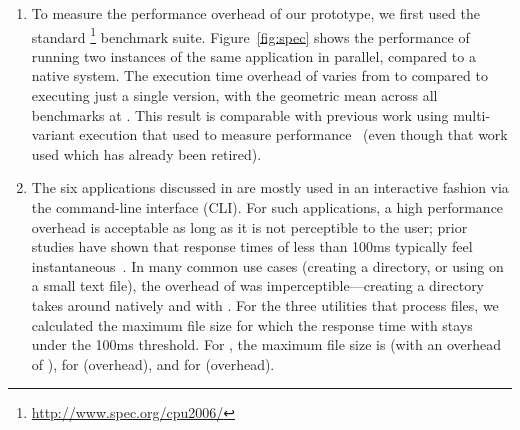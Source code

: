 \begin{enumerate}
\item[\speczerosix] To measure the performance overhead of our prototype, we
  first used the standard
  \speczerosix\footnote{\url{http://www.spec.org/cpu2006/}} benchmark suite.
  Figure~\ref{fig:spec} shows the performance of \mx running two instances of
  the same application in parallel, compared to a native system. The execution
  time overhead of \mx varies from \minOverSPEC to \maxOverSPEC compared to
  executing just a single version, with the geometric mean across all
  \numSPECbench benchmarks at \avgOverSPEC. This result is comparable with
  previous work using multi-variant execution that used \speccpu to measure
  performance~\cite{orchestra09} (even though that work used \speczerozero
  which has already been retired).


\item[\gnu~\coreutils] The six \coreutils applications discussed in
   are mostly used in an interactive fashion via the
  command-line interface (CLI). For such applications, a high performance
  overhead is acceptable as long as it is not perceptible to the user; prior
  studies have shown that response times of less than 100ms typically feel
  instantaneous~\cite{card:human_proc}. In many common use cases (\eg creating
  a directory, or using \cut on a small text file), the overhead of \mx was
  imperceptible---\eg creating a directory takes around \avgMkdirNative
  natively and \avgMkdirMx with \mx. For the three utilities that process
  files, we calculated the maximum file size for which the response time with
  \mx stays under the 100ms threshold.  For \cut, the maximum file size is
  \cutCutoffSize (with an overhead of \cutCutoffOver), for \mdsum
  \mdsumCutoffSize (\mdsumCutoffOver overhead), and for \shasum
  \shasumCutoffSize (\shasumCutoffOver overhead).


\end{enumerate}
